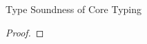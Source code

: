 \documentclass[acmlarge, anonymous, authordraft, review]{acmart} %
\begin{document}
\begin{theorem}{Type Soundness of Core \kafka Typing}{}
  
  \begin{conds}
   \cond{\WFq{\K~\e~\s}}
   \cond{$\EnvType\cdot\s\K\e\t$}
  \end{conds}
  
  \then\axiom{$\Reduce \K\e\s \Kp\ep\sp$}
  \axiom{$\WFp\Kp{\ep~\sp}$}
  \axiom{$\EnvType\cdot\sp\Kp\ep\t$}
  \tor\axiom{$\e$ = $\a$}
  \tor\axiom{$\e$ = $\EE[\DynCall\a\m{\ap}]$}
  \tor\axiom{$\e$ = $\EE[\SubCast\tp\a]$}
  \tor\axiom{$\e$ = $\EE[\BehCast\tp\a]$}  

  \begin{proof} 

  \end{proof}
\end{theorem}

\end{document}
